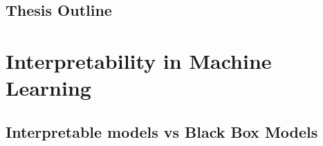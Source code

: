 \documentclass[english]{tktltiki2}
\theoremstyle{definition}
\theoremstyle{remark}
\begin{document}
\subsection{Thesis Outline} %


\section{Interpretability in Machine Learning}\label{sec:interpretability_in_ML} %

\subsection{Interpretable models vs Black Box Models} %
\end{document}
